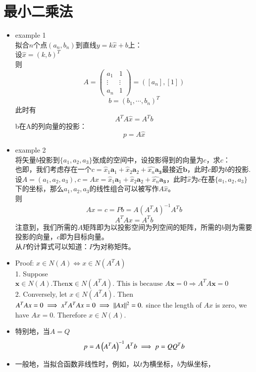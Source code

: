 \documentclass[UTF8,9pt]{ctexart}
\begin{document}
\section{最小二乘法}
\begin{itemize}
	\item example 1\\
		拟合$n$个点$(a_n,b_n)$到直线$y=k\hat{x}+b$上：\\
		设$\hat{x}=(k,b)^T$\\
		则 $$A=\begin{pmatrix}
			a_1&1\\
			\vdots&\vdots\\
			a_n&1
		\end{pmatrix}=([a_n],[1])$$
		$$b=(b_1,\cdots,b_n)^T$$
		此时有
		$$A^TA\hat{x}=A^Tb$$
		b在A的列向量的投影：
		$$p=A\hat{x}$$
	\item example 2\\
		将矢量$b$投影到$\{a_1,a_2,a_3\}$张成的空间中，设投影得到的向量为$c$，求$c$：\\
		也即，我们考虑存在一个$c=\widehat {x}_{ 1 } \mathbf { a } _ { 1 } +\widehat { x } _ {2} \mathbf { a } _ {2} +\widehat { x _ { n } } \mathbf { a } _ { \mathbf { 3 } }$最接近$\bm{b}$，此时$c$即为$b$的投影.\\
		设$A=\left( a_1,a_2,a_3 \right), c=Ax=\widehat {x}_{ 1 } \mathbf { a } _ { 1 } +\widehat { x } _ {2} \mathbf { a } _ {2} +\widehat { x _ { n } } \mathbf { a } _ { \mathbf { 3 } }$，此时$\hat{x}$为$c$在基$\{a_1,a_2,a_3\}$下的坐标，那么$a_1, a_2,a_3$的线性组合可以被写作$A\hat{x}$。\\
		则
		$$Ax=c=Pb=A(A^TA)^{-1}A^Tb$$ 
		$$A^TAx=A^Tb$$
		注意到，我们所需的$A$矩阵即为以投影空间为列空间的矩阵，所需的$b$则为需要投影的向量，$c$即为目标向量。\\
		从$P$的计算式可以知道：$P$为对称矩阵。
	\item Proof: $x \in N(A) \iff x \in N(A^TA)$\\
		1. Suppose $\mathbf{x}\in N(A).\text{Then}\mathbf{x}\in N\left(A^{T}A\right).\text{ This is because }A\mathbf{x}=0\Rightarrow A^{T}A\mathbf{x}=0$\\
		2. Conversely, let $x\in N\left(A^{T}A\right).$ Then $A^{T}Ax=0 \implies x^{T}A^{T}Ax=0 \implies \|Ax\|^{2}=0.$ since the length of $Ax$ is zero, we have $Ax=0$. Therefore $x\in N(A)$.
	\item 特别地，当$A=Q$\\
		$$p= A \left( A ^TA \right) ^ { - 1 } A ^Tb \implies p = Q Q ^Tb$$
	\item 一般地，当拟合函数非线性时，例如，以$t$为横坐标，$b$为纵坐标，

\end{itemize}
\end{document}
